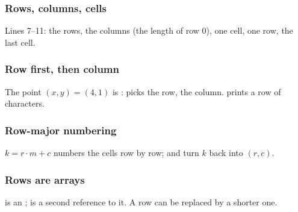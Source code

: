 \documentclass[aspectratio=169,10pt,compress]{beamer}
\begin{document}




\begin{frame}[t,fragile] \frametitle{Rows, columns, cells}

	\footnotesize Lines 7--11: the rows, the columns (the length of row 0), one cell, one row, the last cell.
\end{frame}




\begin{frame}[t,fragile] \frametitle{Row first, then column}

	\footnotesize The point $(x, y) = (4, 1)$ is :  picks the row,  the column.  prints a row of characters.
\end{frame}




\begin{frame}[t,fragile] \frametitle{Row-major numbering}

	\footnotesize $k = r \cdot m + c$ numbers the cells row by row; \hCode{/} and \hCode{\%} turn $k$ back into $(r, c)$.
\end{frame}








\begin{frame}[t,fragile] \frametitle{Rows are arrays}

	\footnotesize {} is an ;  is a second reference to it. A row can be replaced by a shorter one.
\end{frame}
\end{document}
